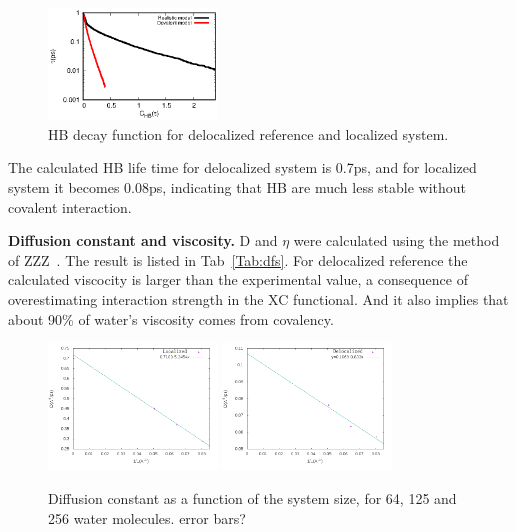 \documentclass[prl,twocolumn,showpacs]{revtex4}
\begin{document}
\begin{figure}
\includegraphics[width=0.4\textwidth]{new_hbdecay}
\caption{HB decay function for delocalized reference and localized system.} \label{Fig:HBdecay}
\end{figure}

The calculated HB life time for delocalized system is 0.7ps, and for localized system it becomes 0.08ps, indicating that HB are much less stable without covalent interaction. 
 
 
\textbf{Diffusion constant and viscosity.} D and $\eta$ were calculated using the method of ZZZ~\cite{dunweg1993molecular}. The result is listed in Tab~\ref{Tab:dfs}. For delocalized reference the calculated viscocity is larger than the experimental value, a consequence of overestimating interaction strength in the XC functional. And it also implies that about 90\% of water's viscosity comes from covalency.

\begin{figure}
\includegraphics[width=0.4\textwidth]{ALMO_0_msd}
\includegraphics[width=0.4\textwidth]{FULL_SCF_msd}
\caption{Diffusion constant as a function of the system size, for 64, 125 and 256 water molecules. \new error bars?\old }\label{Fig:dfs}
\end{figure} 
\end{document}
